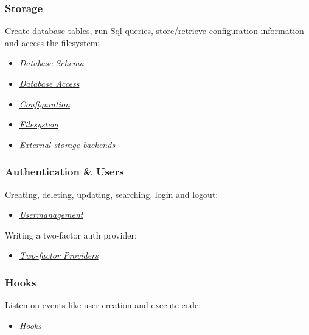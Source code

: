 \documentclass[letterpaper,10pt,english]{sphinxmanual}
\begin{document}
\subsubsection{Storage}
\label{app/index:storage}
Create database tables, run Sql queries, store/retrieve configuration information and access the filesystem:
\begin{itemize}
\item {} 
{\hyperref[app/schema::doc]{\emph{Database Schema}}}

\item {} 
{\hyperref[app/database::doc]{\emph{Database Access}}}

\item {} 
{\hyperref[app/configuration::doc]{\emph{Configuration}}}

\item {} 
{\hyperref[app/filesystem::doc]{\emph{Filesystem}}}

\item {} 
{\hyperref[app/extstorage::doc]{\emph{External storage backends}}}

\end{itemize}


\subsubsection{Authentication \& Users}
\label{app/index:authentication-users}
Creating, deleting, updating, searching, login and logout:
\begin{itemize}
\item {} 
{\hyperref[app/users::doc]{\emph{Usermanagement}}}

\end{itemize}

Writing a two-factor auth provider:
\begin{itemize}
\item {} 
{\hyperref[app/two-factor-provider::doc]{\emph{Two-factor Providers}}}

\end{itemize}


\subsubsection{Hooks}
\label{app/index:hooks}
Listen on events like user creation and execute code:
\begin{itemize}
\item {} 
{\hyperref[app/hooks::doc]{\emph{Hooks}}}

\end{itemize}
\end{document}
